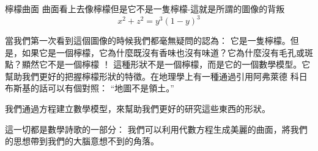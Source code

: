 \begin{surferPage}{檸檬曲面}
曲面看上去像檸檬但是它不是一隻檸檬-這就是所謂的圖像的背叛\\
\smallskip
\[x^2 + z^2 = y^3 (1 - y)^3\] 

\singlespacing
當我們第一次看到這個圖像的時候我們都毫無疑問的認為： 它是一隻檸檬。但是，如果它是一個檸檬，它為什麼既沒有香味也沒有味道？它為什麼沒有毛孔或斑點？顯然它不是一個檸檬 ！
\singlespacing
這種形狀不是一個檸檬，而是它的一個數學模型。它幫助我們更好的把握檸檬形狀的特徵。在地理學上有一種通過引用阿弗萊德 科日布斯基的話可以有個對照： \enquote{地圖不是領土。}\\

\singlespacing

我們通過方程建立數學模型，來幫助我們更好的研究這些東西的形狀。

\singlespacing

這一切都是數學詩歌的一部分： 我們可以利用代數方程生成美麗的曲面，將我們的思想帶到我們的大腦意想不到的角落。
\end{surferPage}
